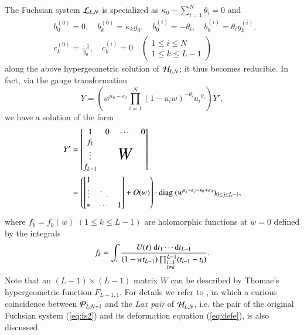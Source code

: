 \documentclass[12pt]{article}
\numberwithin{equation}{section}
\begin{document}
The Fuchsian system ${\cal L}_{L,N}$
is specialized as
$\kappa_0-\sum_{i=1}^N \theta_i=0$ and
\begin{align}
&b_0^{(0)}=0,  \quad
b_k^{(0)}= \kappa_k y_0, \quad
 b_0^{(i)}=-\theta_i,
\quad
b_k^{(i)}= \theta_i y_k^{(i)}, 
\nonumber
\\
&c_k^{(0)}=\frac{-1}{y_0}, \quad
c_k^{(i)}=0 \quad  
\left(
\begin{array}{c}
 1 \leq i \leq N \\
1 \leq k \leq L-1
\end{array}
\right)
\label{eq:special}
\end{align}
along
the above hypergeometric solution of
${\cal H}_{L,N}$;
it thus becomes reducible.
In fact, via the gauge transformation
\[
Y= \left(w^{\kappa_0-e_0} \prod_{i=1}^N (1- u_i w)^{-\theta_i} {u_i}^{\theta_i} \right)Y',
\]
we have a solution of the form
\begin{align*}
Y' 
&=
\begin{bmatrix}
1 & 0 & \cdots & 0 \\
f_1 & & & \\
\vdots && \mbox{\huge $W$}  & \\
f_{L-1} &&&
\end{bmatrix}
\\
&=
\left(
\begin{bmatrix}
1   \\   
 \vdots&\ddots \\ 
*& \cdots&1
\end{bmatrix}
+O(w)
\right)
\cdot
{\rm diag \ }  (w^{\kappa_j -e_j -\kappa_0 + e_0 })_{0 \leq j \leq L-1},
\end{align*}
where
$f_k=f_k(w)$ $(1 \leq k \leq L-1)$
are holomorphic functions 
at $w=0$ defined by the integrals
\[
f_k
=
\int_{c}
 \frac{U({\boldsymbol t}) \ 
 {\rm d}t_1 \cdots {\rm d}t_{L-1} }{ 
 (1-w t_{L-1})
 \prod_{
 \begin{subarray}{l} 
 l=1 \\  l \neq k 
 \end{subarray}  
 }^{L-1}(t_{l-1}-t_l)
 }.
 \]
Note that an $(L-1) \times (L-1)$ matrix $W$  
can be described by Thomae's hypergeometric function 
$F_{L-1,1}$.
For details we refer to \cite{tsu14b},
in which 
a curious coincidence between 
${\cal P}_{L,N+1}$ and 
the {\it Lax pair} of ${\cal H}_{L,N}$, 
i.e.
the pair of
the original Fuchsian system 
(\ref{eq:fs2})
and its deformation equation
(\ref{eq:defe}),
is also discussed.
\end{document}
